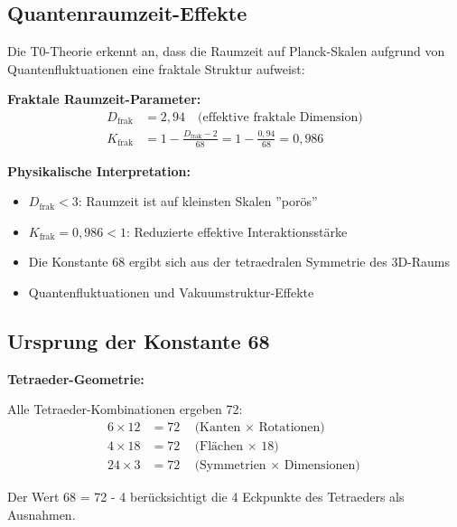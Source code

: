 	\subsection{Quantenraumzeit-Effekte}
	
	Die T0-Theorie erkennt an, dass die Raumzeit auf Planck-Skalen aufgrund von Quantenfluktuationen eine fraktale Struktur aufweist:
	
	\begin{keyresult}
		\textbf{Fraktale Raumzeit-Parameter:}
		\begin{align}
			D_{\text{frak}} &= 2{,}94 \quad \text{(effektive fraktale Dimension)} \\
			K_{\text{frak}} &= 1 - \frac{D_{\text{frak}} - 2}{68} = 1 - \frac{0{,}94}{68} = 0{,}986
		\end{align}
		
		\textbf{Physikalische Interpretation:}
		\begin{itemize}
			\item $D_{\text{frak}} < 3$: Raumzeit ist auf kleinsten Skalen ''porös''
			\item $K_{\text{frak}} = 0{,}986 < 1$: Reduzierte effektive Interaktionsstärke
			\item Die Konstante 68 ergibt sich aus der tetraedralen Symmetrie des 3D-Raums
			\item Quantenfluktuationen und Vakuumstruktur-Effekte
		\end{itemize}
	\end{keyresult}
	
	\subsection{Ursprung der Konstante 68}
	
	\begin{alternative}
		\textbf{Tetraeder-Geometrie:}
		
		Alle Tetraeder-Kombinationen ergeben 72:
		\begin{align}
			6 \times 12 &= 72 \quad \text{(Kanten $\times$ Rotationen)} \\
			4 \times 18 &= 72 \quad \text{(Flächen $\times$ 18)} \\
			24 \times 3 &= 72 \quad \text{(Symmetrien $\times$ Dimensionen)}
		\end{align}
		
		Der Wert 68 = 72 - 4 berücksichtigt die 4 Eckpunkte des Tetraeders als Ausnahmen.
	\end{alternative}
	

